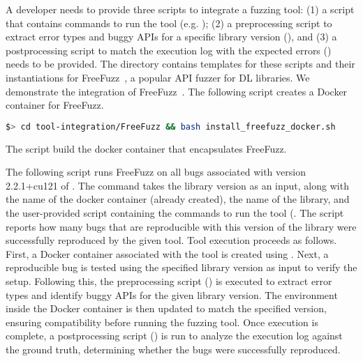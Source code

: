 \documentclass[sigconf,screen]{acmart}
\begin{document}
A developer needs to provide three scripts to integrate a fuzzing
tool: (1) a script that contains commands to run the tool (e.g. ); (2) a
preprocessing script to extract error types and buggy APIs for a
specific library version (), and (3) a postprocessing script to match the
execution log with the expected errors () needs to be provided.
The
directory  contains templates for these
scripts and their instantiations for FreeFuzz~\cite{wei2022free}, a
popular API fuzzer for DL libraries.
We demonstrate the integration of FreeFuzz~\cite{wei2022free}. The
following script creates a Docker container for FreeFuzz.

\begin{lstlisting}[language=bash,basicstyle=\small,keywords={}]
$> cd tool-integration/FreeFuzz && bash install_freefuzz_docker.sh
\end{lstlisting}

\noindent
The script  build the docker
container that encapsulates FreeFuzz.


The following script runs FreeFuzz on all bugs associated with version
2.2.1+cu121 of \torch.  The command  takes the library
version as an input, along with the name of the docker container
(already created), the name of the library, and the user-provided
script containing the commands to run the tool
(. The script reports how
many bugs that are reproducible with this version of the library were successfully
reproduced by the given tool.  Tool execution proceeds as
follows. First, a Docker container associated with the tool is created using
. Next, a reproducible bug is tested using
the specified library version as input to verify the setup.
Following this, the preprocessing script () is executed 
to extract error types and identify buggy APIs for the given library version.
The environment inside the Docker container is then updated to match the specified version, 
ensuring compatibility before running the fuzzing tool. Once execution is complete, a postprocessing 
script () is run to analyze the execution log against the ground truth, 
determining whether the bugs were successfully reproduced.
\end{document}
